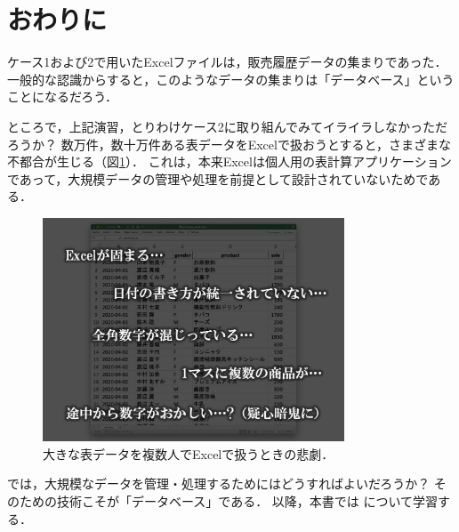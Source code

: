 \section{おわりに}
ケース1および2で用いたExcelファイルは，販売履歴データの集まりであった．
一般的な認識からすると，このようなデータの集まりは「データベース」ということになるだろう．

ところで，上記演習，とりわけケース2に取り組んでみてイライラしなかっただろうか？
数万件，数十万件ある表データをExcelで扱おうとすると，さまざまな不都合が生じる（図\ref{fig:excel-disaster}）．
これは，本来Excelは個人用の表計算アプリケーションであって，大規模データの管理や処理を前提として設計されていないためである．

\begin{figure}[tb]
    \centering
    \includegraphics[width=0.8\textwidth]{figure/excel-disaster.jpg}
    \caption{大きな表データを複数人でExcelで扱うときの悲劇．}
    \label{fig:excel-disaster}
\end{figure}

では，大規模なデータを管理・処理するためにはどうすればよいだろうか？
そのための技術こそが「データベース」である．
以降，本書では について学習する．

